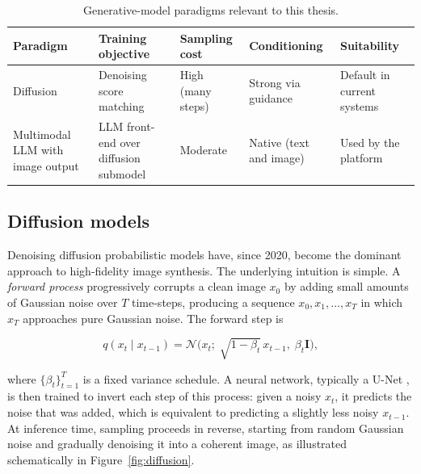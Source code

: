 \begin{table}[ht]
\centering
\caption{Generative-model paradigms relevant to this thesis.}
\label{tab:generative-paradigms}
\small
\renewcommand{\arraystretch}{1.3}
\begin{tabularx}{\textwidth}{|>{\raggedright\arraybackslash}p{2.7cm}|>{\raggedright\arraybackslash}p{2.4cm}|>{\raggedright\arraybackslash}p{1.6cm}|>{\raggedright\arraybackslash}p{2.2cm}|Y|}
\hline
\textbf{Paradigm} & \textbf{Training objective} & \textbf{Sampling cost} & \textbf{Conditioning} & \textbf{Suitability} \\
\hline
Diffusion \cite{ho2020ddpm,rombach2022ldm} & Denoising score matching & High (many steps) & Strong via guidance & Default in current systems \\
\hline
Multimodal LLM with image output & LLM front-end over diffusion submodel & Moderate & Native (text and image) & Used by the platform \\
\hline
\end{tabularx}
\end{table}

\subsection{Diffusion models}

Denoising diffusion probabilistic models \cite{ho2020ddpm} have, since 2020, become the dominant approach to high-fidelity image synthesis. The underlying intuition is simple. A \emph{forward process} progressively corrupts a clean image \(x_0\) by adding small amounts of Gaussian noise over \(T\) time-steps, producing a sequence \(x_0, x_1, \dots, x_T\) in which \(x_T\) approaches pure Gaussian noise. The forward step is

\begin{equation}
q(x_t \mid x_{t-1}) = \mathcal{N}\big(x_t;\; \sqrt{1 - \beta_t}\, x_{t-1},\; \beta_t \mathbf{I}\big),
\label{eq:diffusion-forward}
\end{equation}

where \(\{\beta_t\}_{t=1}^{T}\) is a fixed variance schedule. A neural network, typically a U-Net \cite{ronneberger2015unet}, is then trained to invert each step of this process: given a noisy \(x_t\), it predicts the noise that was added, which is equivalent to predicting a slightly less noisy \(x_{t-1}\). At inference time, sampling proceeds in reverse, starting from random Gaussian noise and gradually denoising it into a coherent image, as illustrated schematically in Figure~\ref{fig:diffusion}.

